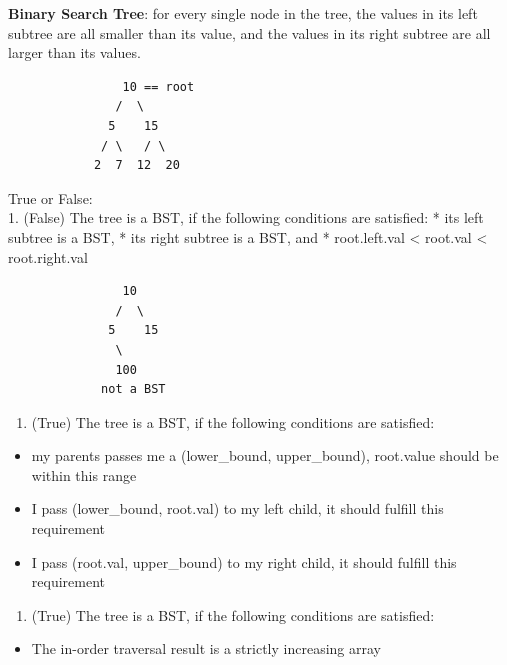 \documentclass[11pt]{article}
\providecommand{\tightlist}{%
      \setlength{\itemsep}{0pt}\setlength{\parskip}{0pt}}
\begin{document}
\textbf{Binary Search Tree}: for every single node in the tree, the
values in its left subtree are all smaller than its value, and the
values in its right subtree are all larger than its values.

\begin{verbatim}
                10 == root
               /  \
              5    15
             / \   / \ 
            2  7  12  20
\end{verbatim}

True or False:\\
1. (False) The tree is a BST, if the following conditions are satisfied:
* its left subtree is a BST, * its right subtree is a BST, and *
root.left.val \textless{} root.val \textless{} root.right.val

\begin{verbatim}
                10 
               /  \
              5    15
               \   
               100
             not a BST
\end{verbatim}

\begin{enumerate}
\def\labelenumi{\arabic{enumi}.}
\setcounter{enumi}{1}
\tightlist
\item
  (True) The tree is a BST, if the following conditions are satisfied:
\end{enumerate}

\begin{itemize}
\tightlist
\item
  my parents passes me a (lower\_bound, upper\_bound), root.value should
  be within this range
\item
  I pass (lower\_bound, root.val) to my left child, it should fulfill
  this requirement
\item
  I pass (root.val, upper\_bound) to my right child, it should fulfill
  this requirement
\end{itemize}

\begin{enumerate}
\def\labelenumi{\arabic{enumi}.}
\setcounter{enumi}{2}
\tightlist
\item
  (True) The tree is a BST, if the following conditions are satisfied:
\end{enumerate}

\begin{itemize}
\tightlist
\item
  The in-order traversal result is a strictly increasing array
\end{itemize}
\end{document}
